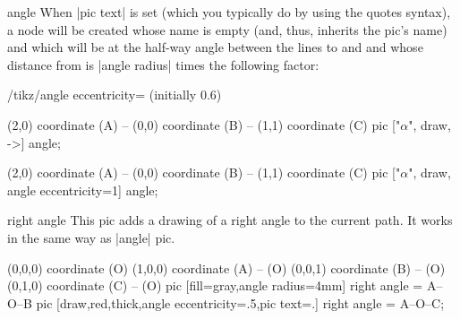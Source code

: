 \begin{pictype}{angle}{}
    When |pic text| is set (which you typically do by using the quotes syntax),
    a node will be created whose name is empty (and, thus, inherits the pic's
    name) and which will be at the half-way angle between the lines to 
    and  and whose distance from  is |angle radius| times the
    following factor:
    \begin{key}{/tikz/angle eccentricity= (initially 0.6)}
\begin{codeexample}[preamble={\usetikzlibrary{angles,quotes}}]
\tikz \draw (2,0) coordinate (A) -- (0,0) coordinate (B)
         -- (1,1) coordinate (C)
  pic ["$\alpha$", draw, ->] {angle};
\end{codeexample}
\begin{codeexample}[preamble={\usetikzlibrary{angles,quotes}}]
\tikz \draw (2,0) coordinate (A) -- (0,0) coordinate (B)
         -- (1,1) coordinate (C)
  pic ["$\alpha$", draw, angle eccentricity=1] {angle};
\end{codeexample}
\begin{codeexample}[preamble={\usetikzlibrary{angles,quotes}}]
\end{codeexample}
    \end{key}
\end{pictype}

\begin{pictype}{right angle}{}
    This pic adds a drawing of a right angle to the current path. It works in
    the same way as |angle| pic.
\begin{codeexample}[preamble={\usetikzlibrary{angles}}]
  \tikz
    \draw (0,0,0) coordinate (O)
      (1,0,0) coordinate (A) -- (O)
      (0,0,1) coordinate (B) -- (O)
      (0,1,0) coordinate (C) -- (O)
      pic [fill=gray,angle radius=4mm] {right angle = A--O--B}
      pic [draw,red,thick,angle eccentricity=.5,pic text=.]
        {right angle = A--O--C};
\end{codeexample}
\end{pictype}


